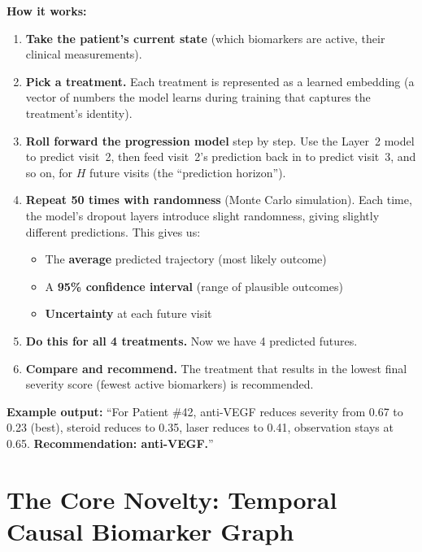 \documentclass[12pt,a4paper]{article}
\begin{document}
\textbf{How it works:}

\begin{enumerate}
  \item \textbf{Take the patient's current state} (which biomarkers are active, their clinical measurements).

  \item \textbf{Pick a treatment.} Each treatment is represented as a learned embedding (a vector of numbers the model learns during training that captures the treatment's identity).

  \item \textbf{Roll forward the progression model} step by step. Use the Layer~2 model to predict visit~2, then feed visit~2's prediction back in to predict visit~3, and so on, for $H$ future visits (the ``prediction horizon'').

  \item \textbf{Repeat 50 times with randomness} (Monte Carlo simulation). Each time, the model's dropout layers introduce slight randomness, giving slightly different predictions. This gives us:
    \begin{itemize}[nosep]
      \item The \textbf{average} predicted trajectory (most likely outcome)
      \item A \textbf{95\% confidence interval} (range of plausible outcomes)
      \item \textbf{Uncertainty} at each future visit
    \end{itemize}

  \item \textbf{Do this for all 4 treatments.} Now we have 4 predicted futures.

  \item \textbf{Compare and recommend.} The treatment that results in the lowest final severity score (fewest active biomarkers) is recommended.
\end{enumerate}

\begin{mdframed}[style=keypoint]
\textbf{Example output:} ``For Patient \#42, anti-VEGF reduces severity from 0.67 to 0.23 (best), steroid reduces to 0.35, laser reduces to 0.41, observation stays at 0.65. \textbf{Recommendation: anti-VEGF.}''
\end{mdframed}


\section{The Core Novelty: Temporal Causal Biomarker Graph}
\end{document}
